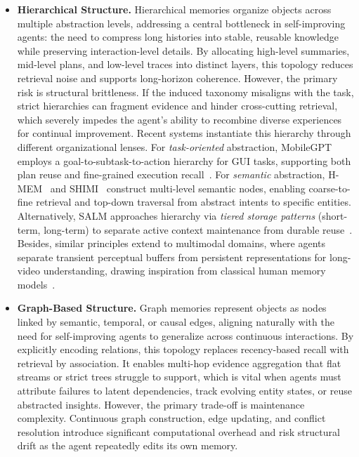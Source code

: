 \documentclass{article}
\begin{document}
\begin{itemize}[leftmargin=*]
\item \textbf{Hierarchical Structure.}
    Hierarchical memories organize objects across multiple abstraction levels, addressing a central bottleneck in self-improving agents: the need to compress long histories into stable, reusable knowledge while preserving interaction-level details. By allocating high-level summaries, mid-level plans, and low-level traces into distinct layers, this topology reduces retrieval noise and supports long-horizon coherence. However, the primary risk is structural brittleness. If the induced taxonomy misaligns with the task, strict hierarchies can fragment evidence and hinder cross-cutting retrieval, which severely impedes the agent's ability to recombine diverse experiences for continual improvement. Recent systems instantiate this hierarchy through different organizational lenses. For \textit{task-oriented} abstraction, MobileGPT employs a goal-to-subtask-to-action hierarchy for GUI tasks, supporting both plan reuse and fine-grained execution recall~\citep{lee2024exploreselectderiverecall}. For \textit{semantic} abstraction, H-MEM~\citep{sun2025hierarchicalmemoryhighefficiencylongterm} and SHIMI~\citep{helmi2025decentralizingaimemoryshimi} construct multi-level semantic nodes, enabling coarse-to-fine retrieval and top-down traversal from abstract intents to specific entities. Alternatively, SALM approaches hierarchy via \textit{tiered storage patterns} (short-term, long-term) to separate active context maintenance from durable reuse~\citep{koley2025salmmultiagentframeworklanguage}. Besides, similar principles extend to multimodal domains, where agents separate transient perceptual buffers from persistent representations for long-video understanding, drawing inspiration from classical human memory models~\citep{cheng2022xmemlongtermvideoobject, song2024moviechatdensetokensparse, atkinson1968human}.

    \item \textbf{Graph-Based Structure.} Graph memories represent objects as nodes linked by semantic, temporal, or causal edges, aligning naturally with the need for self-improving agents to generalize across continuous interactions. By explicitly encoding relations, this topology replaces recency-based recall with retrieval by association. It enables multi-hop evidence aggregation that flat streams or strict trees struggle to support, which is vital when agents must attribute failures to latent dependencies, track evolving entity states, or reuse abstracted insights. However, the primary trade-off is maintenance complexity. Continuous graph construction, edge updating, and conflict resolution introduce significant computational overhead and risk structural drift as the agent repeatedly edits its own memory.


\end{itemize}
\end{document}
